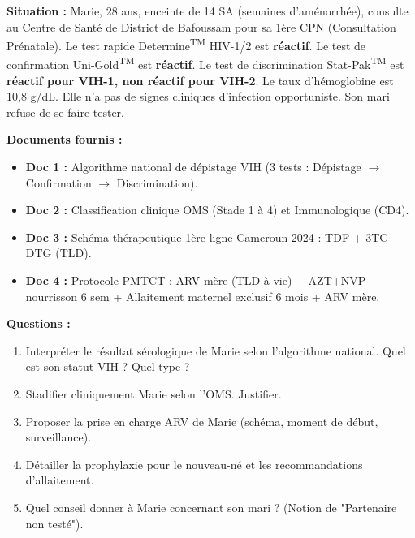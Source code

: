 \documentclass[11pt]{article}
\begin{document}
\begin{exoresolu}
\textbf{Situation :} Marie, 28 ans, enceinte de 14 SA (semaines d'aménorrhée), consulte au Centre de Santé de District de Bafoussam pour sa 1ère CPN (Consultation Prénatale). Le test rapide Determine\textsuperscript{TM} HIV-1/2 est \textbf{réactif}. Le test de confirmation Uni-Gold\textsuperscript{TM} est \textbf{réactif}. Le test de discrimination Stat-Pak\textsuperscript{TM} est \textbf{réactif pour VIH-1, non réactif pour VIH-2}. Le taux d'hémoglobine est 10,8 g/dL. Elle n'a pas de signes cliniques d'infection opportuniste. Son mari refuse de se faire tester.

\textbf{Documents fournis :}
\begin{itemize}
\item \textbf{Doc 1 :} Algorithme national de dépistage VIH (3 tests : Dépistage $\to$ Confirmation $\to$ Discrimination).
\item \textbf{Doc 2 :} Classification clinique OMS (Stade 1 à 4) et Immunologique (CD4).
\item \textbf{Doc 3 :} Schéma thérapeutique 1ère ligne Cameroun 2024 : TDF + 3TC + DTG (TLD).
\item \textbf{Doc 4 :} Protocole PMTCT : ARV mère (TLD à vie) + AZT+NVP nourrisson 6 sem + Allaitement maternel exclusif 6 mois + ARV mère.
\end{itemize}

\textbf{Questions :}
\begin{enumerate}
\item Interpréter le résultat sérologique de Marie selon l'algorithme national. Quel est son statut VIH ? Quel type ?
\item Stadifier cliniquement Marie selon l'OMS. Justifier.
\item Proposer la prise en charge ARV de Marie (schéma, moment de début, surveillance).
\item Détailler la prophylaxie pour le nouveau-né et les recommandations d'allaitement.
\item Quel conseil donner à Marie concernant son mari ? (Notion de "Partenaire non testé").
\end{enumerate}


\end{exoresolu}
\end{document}
